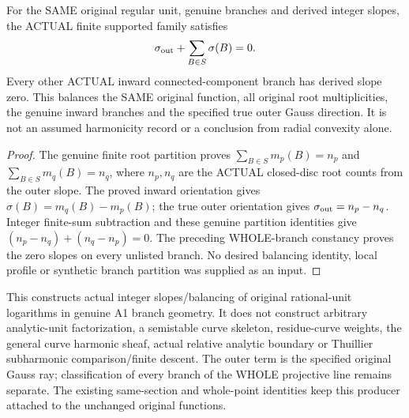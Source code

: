 \begin{theorem}
\label{analytic:actual-original-rational-unit-gauss-balancing}
\leanok
{}
For the SAME original regular unit, genuine branches and derived integer
slopes, the ACTUAL finite supported family satisfies
\[
 \sigma_{\rm out}+\sum_{B\in S}\sigma(B)=0.
\]
Every other ACTUAL inward connected-component branch has derived slope zero.
This balances the SAME original function, all original root multiplicities,
the genuine inward branches and the specified true outer Gauss direction.
It is not an assumed harmonicity record or a conclusion from radial
convexity alone.
\end{theorem}
\begin{proof}
The genuine finite root partition proves
$\sum_{B\in S}m_p(B)=n_p$ and $\sum_{B\in S}m_q(B)=n_q$,
where $n_p,n_q$ are the ACTUAL closed-disc root counts from the outer slope.
The proved inward orientation gives $\sigma(B)=m_q(B)-m_p(B)$;
the true outer orientation gives $\sigma_{\rm out}=n_p-n_q$.
Integer finite-sum subtraction and these genuine partition identities give
$(n_p-n_q)+(n_q-n_p)=0$. The preceding WHOLE-branch constancy proves the
zero slopes on every unlisted branch. No desired balancing identity, local
profile or synthetic branch partition was supplied as an input.
\end{proof}

\begin{remark}
This constructs actual integer slopes/balancing of original rational-unit
logarithms in genuine A1 branch geometry. It does not construct arbitrary
analytic-unit factorization, a semistable curve skeleton, residue-curve
weights, the general curve harmonic sheaf, actual relative analytic boundary
or Thuillier subharmonic comparison/finite descent. The outer term is the
specified original Gauss ray; classification of every branch of the WHOLE
projective line remains separate. The existing same-section and whole-point
identities keep this producer attached to the unchanged original functions.
\end{remark}
